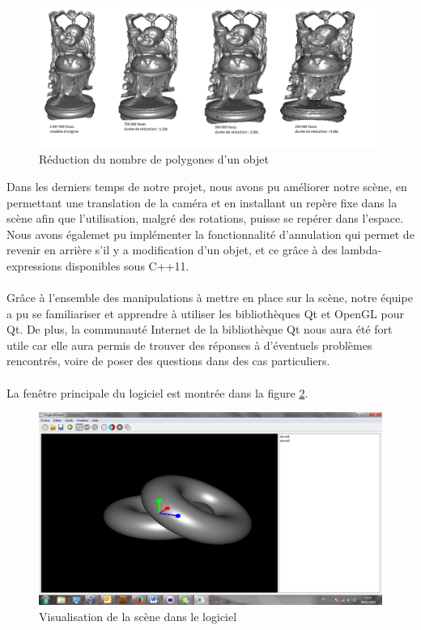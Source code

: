 \begin{figure}[h]
	\centering
	\includegraphics[scale=0.5]{images/reduction.png}
	\caption{\label{fig:decimation} Réduction du nombre de polygones d'un objet \protect}
\end{figure}

Dans les derniers temps de notre projet, nous avons pu améliorer notre scène, en permettant une translation de la caméra et en installant un repère fixe dans la scène afin que l'utilisation, malgré des rotations, puisse se repérer dans l'espace. Nous avons égalemet pu implémenter la fonctionnalité d'annulation qui permet de revenir en arrière s'il y a modification d'un objet, et ce grâce à des lambda-expressions disponibles sous C++11.

\paragraph{}
Grâce à l'ensemble des manipulations à mettre en place sur la scène, notre équipe a pu se familiariser et apprendre à utiliser les bibliothèques Qt et OpenGL pour Qt. De plus, la communauté Internet de la bibliothèque Qt nous aura été fort utile car elle aura permis de trouver des réponses à d'éventuels problèmes rencontrés, voire de poser des questions dans des cas particuliers.

\paragraph{}
La fenêtre principale du logiciel est montrée dans la figure \ref{fig:screenScene}.

\begin{figure}[h]
	\centering
	\includegraphics[scale=0.4]{Scene.png}
	\caption{\label{fig:screenScene} Visualisation de la scène dans le logiciel \protect}
\end{figure}

